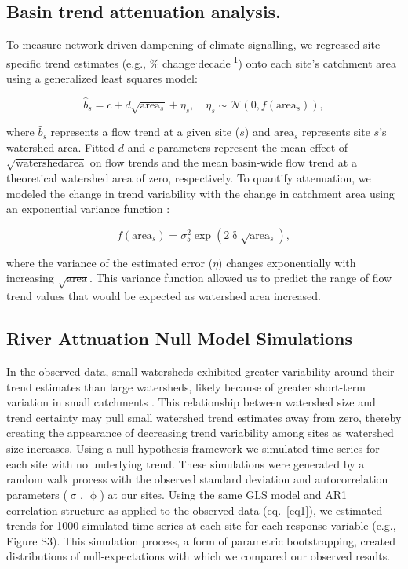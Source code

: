 \documentclass[9pt,twocolumn,twoside,lineno]{pnas-new}
\begin{document}
{\subsection{Basin trend attenuation analysis.}
To measure network driven dampening of climate signalling, we regressed site-specific trend estimates (e.g., \% change$\cdot$decade\textsuperscript{-1}) onto each site's catchment area using a generalized least squares model:
\begin{linenomath*}
\begin{equation}
	\hat{b}_{s} = c + d\sqrt{\mathrm{area}_{s}} + \eta_{s}, \quad
  \eta_{s} \sim \mathcal{N}(0, f(\mathrm{area}_{s})) \label{eq2},
\end{equation}
\end{linenomath*}
where $\hat{b}_{s}$ represents a flow trend at a given site ($s$) and $\mathrm{area}_{s}$ represents site $s$'s watershed area. Fitted $d$ and $c$ parameters represent the mean effect of $\sqrt{\mathrm{watershed area}}$ on flow trends and the mean basin-wide flow trend at a theoretical watershed area of zero, respectively. To quantify attenuation, we modeled the change in trend variability with the change in catchment area using an exponential variance function \citep[p.~211]{Pinheiro:2006}: 
\begin{linenomath*}
\begin{equation}
	f(\mathrm{area}_{s})=\sigma_b^2 \exp(2\updelta\sqrt{\mathrm{area}_{s}}) \label{eq3},
\end{equation}
\end{linenomath*} 
where the variance of the estimated error ($\eta$) changes exponentially with increasing $\sqrt{\mathrm{area}}$. This variance function allowed us to predict the range of flow trend values that would be expected as watershed area increased. 

\subsection{River Attnuation Null Model Simulations}
In the observed data, small watersheds exhibited greater variability around their trend estimates than large watersheds, likely because of greater short-term variation in small catchments \citep{Moore:2015}. This relationship between watershed size and trend certainty may pull small watershed trend estimates away from zero, thereby creating the appearance of decreasing trend variability among sites as watershed size increases. Using a null-hypothesis framework we simulated time-series for each site with no underlying trend. These simulations were generated by a random walk process with the observed standard deviation and autocorrelation parameters ($\hat{\upsigma}$, $\hat{\upphi}$) at our sites. Using the same GLS model and AR1 correlation structure as applied to the observed data (eq.~\ref{eq1}), we estimated trends for 1000 simulated time series at each site for each response variable (e.g., Figure S3). This simulation process, a form of parametric bootstrapping, created distributions of null-expectations with which we compared our observed results.

}
\end{document}
